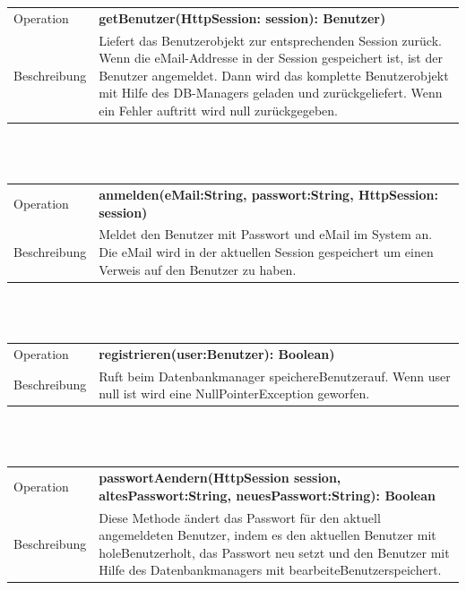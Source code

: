 \documentclass[12pt]{scrreprt}
\begin{document}
\begin{tabular}{|lp{12cm}|}
	\hline
	Operation &  \textbf{getBenutzer(HttpSession: session): Benutzer) }\\ 
	Beschreibung & Liefert das Benutzerobjekt zur entsprechenden Session zurück. Wenn die eMail-Addresse in der Session gespeichert ist, ist der Benutzer angemeldet. Dann wird das komplette Benutzerobjekt mit Hilfe des DB-Managers geladen und zurückgeliefert. Wenn ein Fehler auftritt wird null zurückgegeben.\\
	\hline 
\end{tabular} \\\\


\begin{tabular}{|lp{12cm}|}
	\hline
	Operation &  \textbf{anmelden(eMail:String, passwort:String, HttpSession: session) }\\ 
	Beschreibung & Meldet den Benutzer mit Passwort und eMail im System an. Die eMail wird in der aktuellen Session gespeichert um einen Verweis auf den Benutzer zu haben. \\ 
	\hline 
\end{tabular} \\\\

\begin{tabular}{|lp{12cm}|}
	\hline
	Operation &  \textbf{registrieren(user:Benutzer): Boolean) }\\ 
	Beschreibung & Ruft beim Datenbankmanager \glqq speichereBenutzer\grqq auf. Wenn user null ist wird eine NullPointerException geworfen. \\ 
	\hline 
\end{tabular} \\\\

\begin{tabular}{|lp{12cm}|}
	\hline
	Operation &  \textbf{passwortAendern(HttpSession session, altesPasswort:String, neuesPasswort:String): Boolean }\\ 
	Beschreibung & Diese Methode ändert das Passwort für den aktuell angemeldeten Benutzer, indem es den aktuellen Benutzer mit \glqq holeBenutzer\grqq holt, das Passwort neu setzt und den Benutzer mit Hilfe des Datenbankmanagers mit \glqq bearbeiteBenutzer\grqq speichert.\\ 
	\hline 
\end{tabular} \\\\
\end{document}
